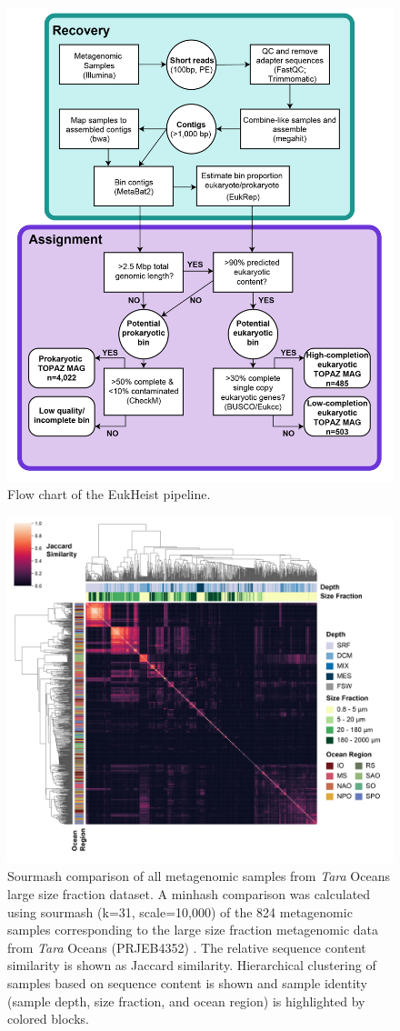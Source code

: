 \documentclass[12pt]{article}
\numberwithin{equation}{section}
\begin{document}
\begin{figure}
    \centering
    \includegraphics[width=0.7\columnwidth]{si-figures/flow-chart-01.png}
    \caption{Flow chart of the EukHeist pipeline.}
    \label{fig:flowchart}
\end{figure}
\begin{figure}
    \centering
    \includegraphics[width=0.95\columnwidth]{si-figures/modified-sourmash-region-size_depth-01.png}
    \caption{Sourmash comparison of all metagenomic samples from \textit{Tara} Oceans large size fraction dataset. A minhash comparison was calculated using sourmash (k=31, scale=10,000) of the 824 metagenomic samples corresponding to the large size fraction metagenomic data from \textit{Tara} Oceans (PRJEB4352) \citep{Titus_Brown_2016}. The relative sequence content similarity is shown as Jaccard similarity. Hierarchical clustering of samples based on sequence content is shown and sample identity (sample depth, size fraction, and ocean region) is highlighted by colored blocks.}
    \label{fig:sourmash}
\end{figure}
\end{document}
